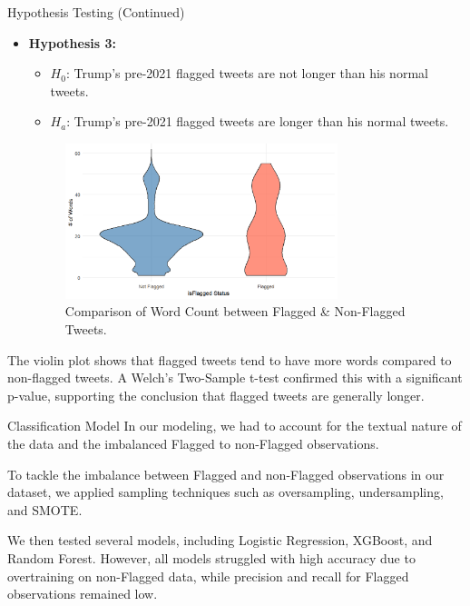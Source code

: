 \documentclass[final]{beamer}
\newlength{\colwidth}
\begin{document}
\begin{frame}[t]
\begin{columns}[t]
\begin{column}{\colwidth}
    \begin{block}{Hypothesis Testing (Continued)}
    \begin{itemize}
        \item \textbf{Hypothesis 3:}
            \begin{itemize}
                    \item[] $H_0$: Trump’s pre-2021 flagged tweets are not longer than his normal tweets.
                    \item[] $H_a$: Trump’s pre-2021 flagged tweets are longer than his normal tweets.
            \end{itemize}
                    \begin{figure}
                        \centering
                        \includegraphics[width=0.75\textwidth]{figures/violinplotnotitle.png}
                        \caption{Comparison of Word Count between Flagged \& Non-Flagged Tweets.}
                    \end{figure}
    \end{itemize}
    The violin plot shows that flagged tweets tend to have more words compared to non-flagged tweets. A Welch's Two-Sample t-test confirmed this with a significant p-value, supporting the conclusion that flagged tweets are generally longer.
    \end{block}
    \vspace{-30pt}  %
    \begin{block}{Classification Model}
        In our modeling, we had to account for the textual nature of the data and the imbalanced Flagged to non-Flagged observations.

        To tackle the imbalance between Flagged and non-Flagged observations in our dataset, we applied sampling techniques such as oversampling, undersampling, and SMOTE.

        We then tested several models, including Logistic Regression, XGBoost, and Random Forest. However, all models struggled with high accuracy due to overtraining on non-Flagged data, while precision and recall for Flagged observations remained low.


\end{block}
\end{column}
\end{columns}
\end{frame}
\end{document}

